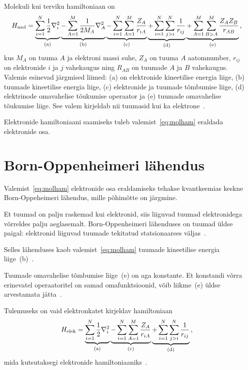 \documentclass[12pt]{report}
\begin{document}
Molekuli kui terviku hamiltoniaan on
\begin{align}\label{eq:molham}
    H_\text{mol} = \underbrace{\sum_{i = 1}^N \frac{1}{2} \nabla_i^2}_\text{(a)}
    \underbrace{- \sum_{A = 1}^M \frac{1}{2 M_A} \nabla_A^2}_\text{(b)}
    \underbrace{- \sum_{i = 1}^N \sum_{A = 1}^M \frac{Z_A}{r_{iA}}}_\text{(c)}
    \underbrace{+ \sum_{i = 1}^N \sum_{j > i}^N \frac{1}{r_{ij}}}_\text{(d)}
    \underbrace{+ \sum_{A = 1}^M \sum_{B > A}^M \frac{Z_A Z_B}{r_{AB}}}_\text{(e)} \rlap{,}
\end{align}
kus \(M_A\) on tuuma \(A\) ja elektroni massi suhe, \(Z_A\) on tuuma \(A\) aatomnumber, \(r_{ij}\) on elektronide \(i\) ja \(j\) vahekaugus ning \(R_{AB}\) on tuumade \(A\) ja \(B\) vahekaugus.
Valemis esinevad järgmised liimed: (a) on elektronide kineetilise energia liige, (b) tuumade kineetilise energia liige, (c) elektronide ja tuumade tõmbumise liige, (d) elektrinode omavahelise tõukumise operaator ja (e) tuumade omavahelise tõukumise liige.
See valem kirjeldab nii tuumasid kui ka elektrone~\cite{szabo+ostlund}.

Elektronide hamiltoniaani saamiseks tuleb valemist~\eqref{eq:molham} eraldada elektronide osa.

\section{Born-Oppenheimeri lähendus}\label{sec:bo}

Valemist~\eqref{eq:molham} elektronide osa eraldamiseks tehakse kvantkeemias keskne Born-Oppeheimeri lähendus, mille põhimõtte on järgmine.

Et tuumad on palju raskemad kui elektronid, siis liiguvad tuumad elektronidega võrreldes palju aeglasemalt.
Born-Oppenheimeri lähenduses on tuumad üldse paigal: elektronid liiguvad tuumade tekitatud statsionaarses väljas~\cite{szabo+ostlund}.

Selles lähenduses kaob valemist~\eqref{eq:molham} tuumade kineetilise energia liige~(b)~\cite{szabo+ostlund}.

Tuumade omavahelise tõmbumise liige~(e) on aga konstante.
Et konstandi võrra erinevatel operaatoritel on samad omafunktsioonid, võib liikme~(e) üldse arvestamata jätta~\cite{szabo+ostlund}.

Tulemuseks on vaid elektronkatet kirjeldav hamiltoniaan
\begin{align}\label{eq:elham}
    H_\text{elek} = \underbrace{\sum_{i = 1}^N \frac{1}{2} \nabla_i^2}_\text{(a)}
    \underbrace{- \sum_{i = 1}^N \sum_{A = 1}^M \frac{Z_A}{r_{iA}}}_\text{(c)}
    \underbrace{+ \sum_{i = 1}^N \sum_{j > i}^N \frac{1}{r_{ij}}}_\text{(d)} \rlap{,}
\end{align}
mida kutsutaksegi elektronide hamiltoniaaniks~\cite{szabo+ostlund}.
\end{document}
